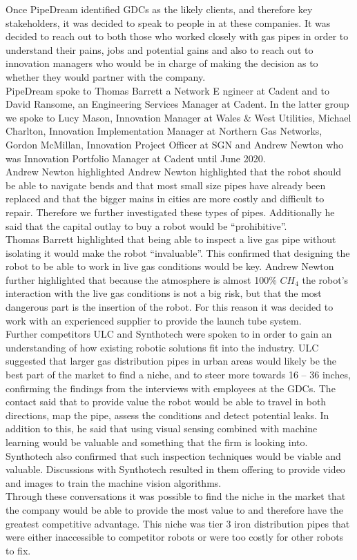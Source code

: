 \documentclass[11pt]{article}		%
\begin{document}
	        Once PipeDream identified GDCs as the likely clients, and therefore key stakeholders, it was decided to speak to people in at these companies. It was decided to reach out to both those who worked closely with gas pipes in order to understand their pains, jobs and potential gains and also to reach out to innovation managers who would be in charge of making the decision as to whether they would partner with the company.
	        \\
	         PipeDream spoke to Thomas Barrett a Network E  ngineer at Cadent and to David Ransome, an Engineering Services Manager at Cadent. In the latter group we spoke to Lucy Mason, Innovation Manager at Wales \& West Utilities, Michael Charlton, Innovation Implementation Manager at Northern Gas Networks, Gordon McMillan, Innovation Project Officer at SGN and Andrew Newton who was Innovation Portfolio Manager at Cadent until June 2020.
	        \\
	        Andrew Newton highlighted  Andrew Newton highlighted that the robot should be able to navigate bends and that most small size pipes have already been replaced and that the bigger mains in cities are more costly and difficult to repair. Therefore we further investigated these types of pipes. Additionally he said that the capital outlay to buy a robot would be “prohibitive”. 
	        \\
	        Thomas Barrett highlighted that being able to inspect a live gas pipe without isolating it would make the robot “invaluable”. This confirmed that designing the robot to be able to work in live gas conditions would be key. Andrew Newton further highlighted that because the atmosphere is almost 100\% ${CH}_4$ the robot’s interaction with the live gas conditions is not a big risk, but that the most dangerous part is the insertion of the robot. For this reason it was decided to work with an experienced supplier to provide the launch tube system.
	        \\
	        Further competitors ULC and Synthotech were spoken to in order to gain an understanding of how existing robotic solutions fit into the industry. ULC suggested that larger gas distribution pipes in urban areas would likely be the best part of the market to find a niche, and to steer more towards 16 – 36 inches, confirming the findings from the interviews with employees at the GDCs. The contact said that to provide value the robot would be able to travel in both directions, map the pipe, assess the conditions and detect potential leaks. In addition to this, he said that using visual sensing combined with machine learning would be valuable and something that the firm is looking into. Synthotech also confirmed that such inspection techniques would be viable and valuable. Discussions with Synthotech resulted in them offering to provide video and images to train the machine vision algorithms.
	        \\
	        Through these conversations it was possible to find the niche in the market that the company would be able to provide the most value to and therefore have the greatest competitive advantage. This niche was tier 3 iron distribution pipes that were either inaccessible to competitor robots or were too costly for other robots to fix.
        
\end{document}
